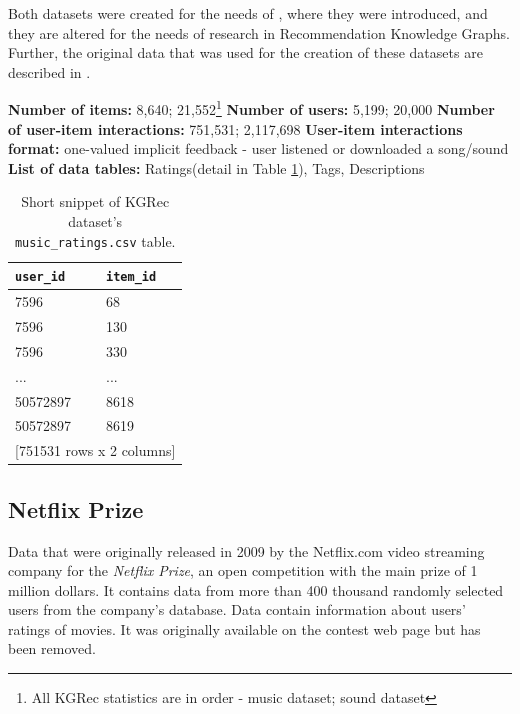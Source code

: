 Both datasets were created for the needs of \cite{kgrec_dataset_origin}, where they were introduced, and they are altered for the needs of research in Recommendation Knowledge Graphs. Further, the original data that was used for the creation of these datasets are described in \cite{kgrec_dataset_origin_full}.


\hfill \break
\noindent
\textbf{Number of items:} 8,640; 21,552\footnote{All KGRec statistics are in order - music dataset; sound dataset} \newline
\textbf{Number of users:} 5,199; 20,000 \newline
\textbf{Number of user-item interactions:} 751,531; 2,117,698 \newline
\textbf{User-item interactions format:} one-valued implicit feedback - user listened or downloaded a song/sound \newline
\textbf{List of data tables:} Ratings(detail in Table \ref{table:5.1_KGRec_ratings}), Tags, Descriptions

\begin{table}[!ht]
    \centering
    \begin{tabular}{ l l }
        \verb|user_id|   & \verb|item_id| \\
        \hline
        7596     &  68  \\
        7596     & 130  \\
        7596     & 330  \\
        ...      & ...  \\
        50572897 & 8618 \\
        50572897 & 8619 \\ [1mm]
        \multicolumn{2}{l}{{[751531 rows x 2 columns]}}
    \end{tabular}
    \caption{Short snippet of KGRec dataset's \texttt{music\_ratings.csv} table.}
    \label{table:5.1_KGRec_ratings}
\end{table}



\subsection{Netflix Prize}

Data that were originally released in 2009 by the Netflix.com video streaming company for the \textit{Netflix Prize}, an open competition with the main prize of 1 million dollars. It contains data from more than 400 thousand randomly selected users from the company's database. Data contain information about users' ratings of movies. It was originally available on the contest web page but has been removed.

